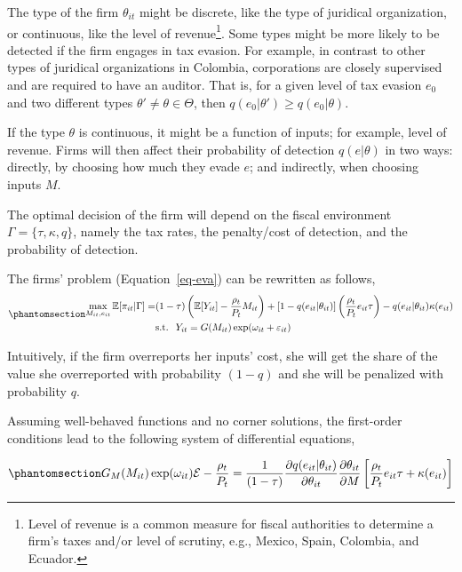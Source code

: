 \documentclass[
  12pt]{article}
\theoremstyle{definition}
\theoremstyle{remark}
\begin{document}
The type of the firm \(\theta_{it}\) might be discrete, like the type of
juridical organization, or continuous, like the level of
revenue\footnote{Level of revenue is a common measure for fiscal
  authorities to determine a firm's taxes and/or level of scrutiny,
  e.g., Mexico, Spain, Colombia, and Ecuador. }. Some
types might be more likely to be detected if the firm engages in tax
evasion. For example, in contrast to other types of juridical
organizations in Colombia, corporations are closely supervised and are
required to have an auditor. That is, for a given level of tax evasion
\(e_0\) and two different types
\(\theta' \not= \theta \in \mathbfcal{\Theta}\), then
\(q(e_0|\theta')\ge q(e_0|\theta)\).

If the type \(\theta\) is continuous, it might be a function of inputs;
for example, level of revenue. Firms will then affect their probability
of detection \(q(e|\theta)\) in two ways: directly, by choosing how much
they evade \(e\); and indirectly, when choosing inputs \(M\).

The optimal decision of the firm will depend on the fiscal environment
\(\Gamma=\{\tau, \kappa, q \}\), namely the tax rates, the penalty/cost
of detection, and the probability of detection.

The firms' problem (Equation~\ref{eq-eva}) can be rewritten as follows,
\begin{equation}\phantomsection\label{eq-eva-2}{
\begin{aligned}
  \max_{M_{it},e_{it}} \mathbb{E}[\pi_{it}|\Gamma] = &(1-\tau)\left(\mathbb{E}[Y_{it}]-\frac{\rho_{t}}{P_t} M_{it}\right)+[1-q(e_{it}|\theta_{it})]\left(\frac{\rho_{t}}{P_t}e_{it}\tau\right)
  -q(e_{it}|\theta_{it})\kappa(e_{it}) \\
  &\text{s.t. }\; Y_{it}=G(M_{it})\exp(\omega_{it}+\varepsilon_{it})
\end{aligned}
}\end{equation}

Intuitively, if the firm overreports her inputs' cost, she will get the
share of the value she overreported with probability \((1-q)\) and she
will be penalized with probability \(q\).

Assuming well-behaved functions and no corner solutions, the first-order
conditions lead to the following system of differential equations,

\begin{equation}\phantomsection\label{eq-foc-cont-m}{
G_M(M_{it})\exp(\omega_{it})\mathcal{E}-\frac{\rho_{t}}{P_t} = \frac{1}{(1-\tau)}\frac{\partial q(e_{it}|\theta_{it})}{\partial \theta_{it}}\frac{\partial \theta_{it}}{\partial M}\left[\frac{\rho_t}{P_t}e_{it}\tau+\kappa(e_{it})\right]
}\end{equation}
\end{document}
